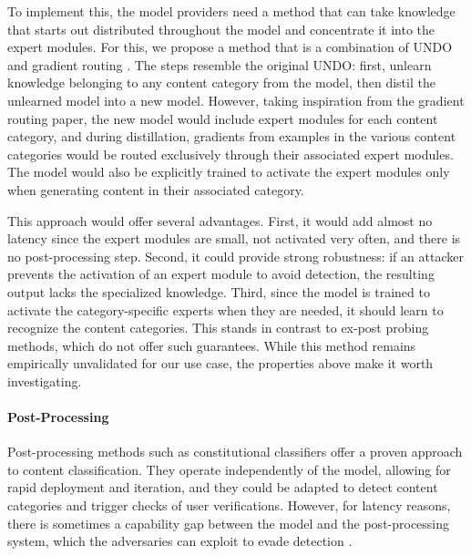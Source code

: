 \documentclass{article}
\theoremstyle{plain}
\theoremstyle{definition}
\theoremstyle{remark}
\begin{document}
To implement this, the model providers need a method that can take knowledge that starts out distributed throughout the model and concentrate it into the expert modules.
For this, we propose a method that is a combination of UNDO \cite{lee2025distillationrobustifiesunlearning} and gradient routing \cite{cloud2024gradientroutingmaskinggradients}.
The steps resemble the original UNDO: first, unlearn knowledge belonging to any content category from the model, then distil the unlearned model into a new model.
However, taking inspiration from the gradient routing paper, the new model would include expert modules for each content category, and during distillation, gradients from examples in the various content categories would be routed exclusively through their associated expert modules.
The model would also be explicitly trained to activate the expert modules only when generating content in their associated category.

This approach would offer several advantages.
First, it would add almost no latency since the expert modules are small, not activated very often, and there is no post-processing step.
Second, it could provide strong robustness: if an attacker prevents the activation of an expert module to avoid detection, the resulting output lacks the specialized knowledge.
Third, since the model is trained to activate the category-specific experts when they are needed, it should learn to recognize the content categories.
This stands in contrast to ex-post probing methods, which do not offer such guarantees.
While this method remains empirically unvalidated for our use case, the properties above make it worth investigating.

\paragraph{Post-Processing}

Post-processing methods such as constitutional classifiers \cite{sharma2025constitutionalclassifiersdefendinguniversal} offer a proven approach to content classification.
They operate independently of the model, allowing for rapid deployment and iteration, and they could be adapted to detect content categories and trigger checks of user verifications.
However, for latency reasons, there is sometimes a capability gap between the model and the post-processing system, which the adversaries can exploit to evade detection \cite{jin2024jailbreakinglargelanguagemodels, kumar2025freelunchguardrails}.
\end{document}
